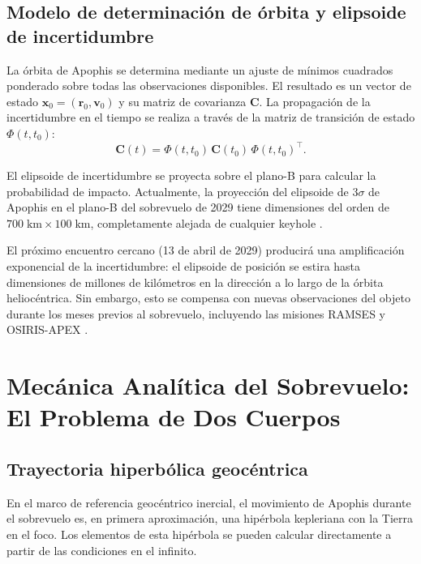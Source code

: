\documentclass[a4paper]{article}
\begin{document}
\subsection{Modelo de determinación de órbita y elipsoide de incertidumbre}

La órbita de Apophis se determina mediante un ajuste de mínimos cuadrados ponderado sobre todas las observaciones disponibles. El resultado es un vector de estado $\mathbf{x}_0 = (\mathbf{r}_0, \mathbf{v}_0)$ y su matriz de covarianza $\mathbf{C}$. La propagación de la incertidumbre en el tiempo se realiza a través de la matriz de transición de estado $\Phi(t, t_0)$:
\begin{equation}
  \mathbf{C}(t) = \Phi(t,t_0)\,\mathbf{C}(t_0)\,\Phi(t,t_0)^\top.
\end{equation}

El elipsoide de incertidumbre se proyecta sobre el plano-B para calcular la probabilidad de impacto. Actualmente, la proyección del elipsoide de 3$\sigma$ de Apophis en el plano-B del sobrevuelo de 2029 tiene dimensiones del orden de $700\;\text{km} \times 100\;\text{km}$, completamente alejada de cualquier keyhole \cite{farnocchia2023orbit, naidu2022radar}.

El próximo encuentro cercano (13 de abril de 2029) producirá una amplificación exponencial de la incertidumbre: el elipsoide de posición se estira hasta dimensiones de millones de kilómetros en la dirección a lo largo de la órbita heliocéntrica. Sin embargo, esto se compensa con nuevas observaciones del objeto durante los meses previos al sobrevuelo, incluyendo las misiones RAMSES y OSIRIS-APEX \cite{esa2024ramses, esa2024apophis}.

\section{Mecánica Analítica del Sobrevuelo: El Problema de Dos Cuerpos}

\subsection{Trayectoria hiperbólica geocéntrica}

En el marco de referencia geocéntrico inercial, el movimiento de Apophis durante el sobrevuelo es, en primera aproximación, una hipérbola kepleriana con la Tierra en el foco. Los elementos de esta hipérbola se pueden calcular directamente a partir de las condiciones en el infinito.
\end{document}
